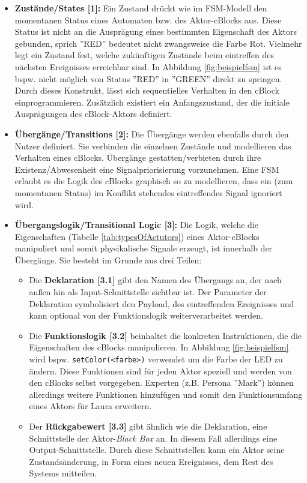 \begin{itemize}
    \item \textbf{Zustände/States [1]:} Ein Zustand drückt wie im \ac{FSM}-Modell den momentanen Status eines Automaten bzw. des Aktor-cBlocks aus. Diese Status ist nicht an die Ausprägung eines bestimmten Eigenschaft des Aktors gebunden, sprich ''RED'' bedeutet nicht zwangsweise die Farbe Rot. Vielmehr legt ein Zustand fest, welche zukünftigen Zustände beim eintreffen des nächsten Ereignisses erreichbar sind. In Abbildung \ref{fig:beispielfsm} ist es bspw. nicht möglich von Status ''RED'' in ''GREEN'' direkt zu springen. Durch dieses Konstrukt, lässt sich sequentielles Verhalten in den cBlock einprogrammieren. Zusätzlich existiert ein Anfangszustand, der die initiale Ausprägungen des cBlock-Aktors definiert.
    \item \textbf{Übergänge/Transitions [2]:} Die Übergänge werden ebenfalls durch den Nutzer definiert. Sie verbinden die einzelnen Zustände und modellieren das Verhalten eines cBlocks. Übergänge gestatten/verbieten durch ihre Existenz/Abwesenheit eine Signalpriorisierung vorzunehmen. Eine \ac{FSM} erlaubt es die Logik des cBlocks graphisch so zu modellieren, dass ein (zum momentanen Status) im Konflikt stehendes eintreffendes Signal ignoriert wird.
    \item \textbf{Übergangslogik/Transitional Logic [3]:} Die Logik, welche die Eigenschaften (Tabelle
\ref{tab:typesOfActutors}) eines Aktor-cBlocks manipuliert und somit physikalische Signale erzeugt, ist innerhalb der Übergänge. Sie besteht im Grunde aus drei Teilen:
    \begin{itemize}
        \item Die \textbf{Deklaration [3.1]} gibt den Namen des Übergangs an, der nach außen hin als Input-Schnittstelle sichtbar ist. Der Parameter der Deklaration symbolisiert den Payload, des eintreffenden Ereignisses und kann optional von der Funktionslogik weiterverarbeitet werden.
        \item Die \textbf{Funktionslogik [3.2]} beinhaltet die konkreten Instruktionen, die die Eigenschaften des cBlocks manipulieren. In Abbildung \ref{fig:beispielfsm} wird bspw. \texttt{setColor(<farbe>)} verwendet um die Farbe der LED zu ändern. Diese Funktionen sind für jeden Aktor speziell und werden von den cBlocks selbst vorgegeben. Experten (z.B. Persona ''Mark'') können allerdings weitere Funktionen hinzufügen und somit den Funktionsumfang eines Aktors für Laura erweitern.
        \item Der \textbf{Rückgabewert [3.3]} gibt ähnlich wie die Deklaration, eine Schnittstelle der Aktor-\textit{Black Box} an. In diesem Fall allerdings eine Output-Schnittstelle. Durch diese Schnittstellen kann ein Aktor seine Zustandsänderung, in Form eines neuen Ereignisses, dem Rest des Systems mitteilen. 
    \end{itemize}
\end{itemize}

